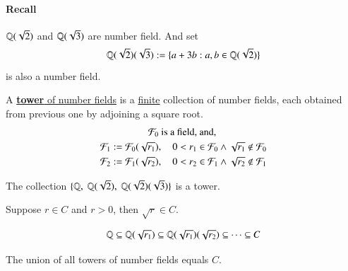 \documentclass[10pt]{article}
\begin{document}
		\paragraph{Recall} $\mathbb{Q}(\sqrt{2})$ and $\mathbb{Q}(\sqrt{3})$ are number field. And set 
		\[
			\mathbb{Q}(\sqrt{2})(\sqrt{3}) := \{a + 3b: a, b \in \mathbb{Q}(\sqrt{2})\}
		\]
		is also a number field.
		\begin{definition}
			A \ul{\textbf{tower} of number fields} is a \ul{finite} collection of number fields, each obtained from previous one by adjoining a square root.
			\begin{gather*}
				\mathcal{{F}}_0 \text{{ is a field, and, }}\\
				\mathcal{{F}}_1 := \mathcal{{F}}_0(\sqrt{r_1}),\quad 0 < r_1 \in \mathcal{{F}}_0 \land \sqrt{r_1} \notin \mathcal{{F}}_0 \\
				\mathcal{{F}}_2 := \mathcal{{F}}_1(\sqrt{r_2}),\quad 0 < r_2 \in \mathcal{{F}}_1	\land \sqrt{r_2} \notin \mathcal{{F}}_1
			\end{gather*}
		\end{definition}
		\begin{example}
			The collection $\{\Q,\ \Q(\sqrt{2}),\ \Q(\sqrt{2})(\sqrt{3})\}$ is a tower.
		\end{example}
		
		\begin{theorem}
			Suppose $r \in C$ and $r > 0$, then $\sqrt{r} \in C$.
		\end{theorem}
		
		\begin{remark}
			\[
				\mathbb{Q} \subseteq \mathbb{Q}(\sqrt{r_1}) \subseteq \mathbb{Q}(\sqrt{r_1})(\sqrt{r_2}) \subseteq \dots \subseteq C
			\]
		\end{remark}
		\begin{theorem}
			The union of all towers of number fields equals $C$.
		\end{theorem}
		
\end{document}
